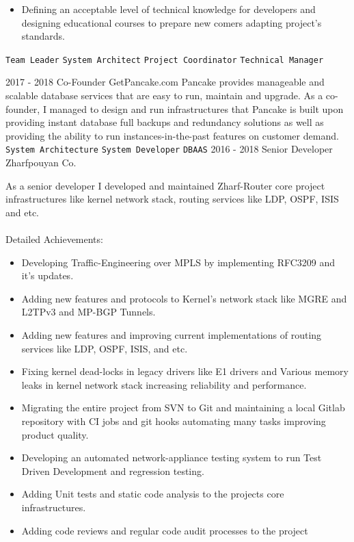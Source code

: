 \documentclass[12pt]{developercv}
\begin{document}
\begin{entrylist}
{\begin{itemize}
			\item Defining an acceptable level of technical knowledge for
			      developers and designing educational courses to prepare
			      new comers adapting project's standards.
		\end{itemize}
		\texttt{Team Leader}\slashsep
		\texttt{System Architect}\slashsep
		\texttt{Project Coordinator}\slashsep
		\texttt{Technical Manager}
		}
	\entry
		{2017 - 2018}
		{Co-Founder}
		{GetPancake.com}
		{
		Pancake provides manageable and scalable database services that
		are easy to run, maintain and upgrade. As a co-founder, I managed
		to design and run infrastructures that Pancake is built upon providing
		instant database full backups and redundancy solutions as well as
		providing the ability to run instances-in-the-past features on customer
		demand.
		\\
		\texttt{System Architecture}\slashsep
		\texttt{System Developer}\slashsep
		\texttt{DBAAS}\slashsep
		}
	\entry
		{2016 - 2018}
		{Senior Developer}
		{Zharfpouyan Co.}
		{
		As a senior developer I developed and maintained Zharf-Router core project
		infrastructures like kernel network stack, routing services like LDP,
		OSPF, ISIS and etc.
		\\
		\\
		Detailed Achievements:
		\begin{itemize}
			\item Developing Traffic-Engineering over MPLS by implementing RFC3209
				  and it's updates.
			\item Adding new features and protocols to Kernel's network stack like
				  MGRE and L2TPv3 and MP-BGP Tunnels.
			\item Adding new features and improving current implementations of
				  routing services like LDP, OSPF, ISIS, and etc.
			\item Fixing kernel dead-locks in legacy drivers like E1 drivers and
				  Various memory leaks in kernel network stack increasing reliability
				  and performance.
			\item Migrating the entire project from SVN to Git and maintaining a
				  local Gitlab repository with CI jobs and git hooks automating
				  many tasks improving product quality.
			\item Developing an automated network-appliance testing system to run
				  Test Driven Development and regression testing.
			\item Adding Unit tests and static code analysis to the projects core
				  infrastructures.
			\item Adding code reviews and regular code audit processes to the project

\end{itemize}}
\end{entrylist}
\end{document}
